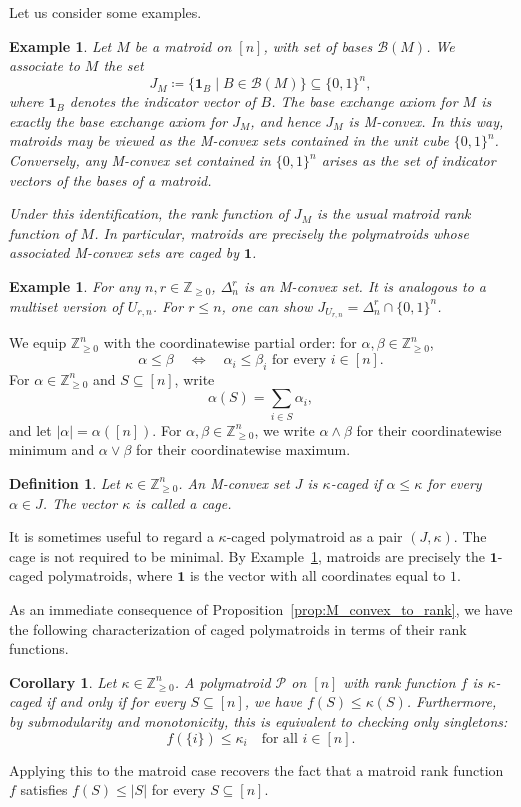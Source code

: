 \documentclass[10pt,a4paper]{amsart}
\newtheorem{corollary}[theorem]{Corollary}
\newtheorem{definition}[theorem]{Definition}
\newtheorem{example}[theorem]{Example}
\newcommand{\Zgeq}{\mathbb{Z}_{\geq 0}}       %
\newcommand{\Zgeqn}{\mathbb{Z}_{\geq 0}^n}     %
\newcommand{\dnr}{\Delta_n^r}
\newcommand{\ones}{\textbf{1}}
\begin{document}
Let us consider some examples.
\begin{example}\label{example:matroids_are_polymatroids}
    Let $M$ be a matroid on $[n]$, with set of bases $\mathcal{B}(M)$. We associate to $M$ the set
    \[
        J_M \coloneqq \{\ones_B \mid B \in \mathcal{B}(M)\} \subseteq \{0,1\}^n,
    \]
    where $\ones_B$ denotes the indicator vector of $B$. The base exchange axiom for $M$ is exactly the base exchange axiom for $J_M$, and hence $J_M$ is M-convex. In this way, matroids may be viewed as the M-convex sets contained in the unit cube $\{0,1\}^n$. Conversely, any M-convex set contained in $\{0,1\}^n$ arises as the set of indicator vectors of the bases of a matroid.

    Under this identification, the rank function of $J_M$ is the usual matroid rank function of $M$. In particular, matroids are precisely the polymatroids whose associated M-convex sets are caged by $\ones$.
\end{example}
\begin{example}
    For any $n,r \in \Zgeq$, $\dnr$ is an M-convex set. It is analogous to a multiset version of $U_{r,n}$. For $r \leq n$, one can show $J_{U_{r,n}} = \dnr \cap \{ 0,1\}^n$. 
\end{example}

We equip $\Zgeqn$ with the coordinatewise partial order: for $\alpha,\beta\in\Zgeqn$,
\[
    \alpha\leq\beta
    \quad\Longleftrightarrow\quad
    \alpha_i\leq\beta_i \text{ for every } i\in[n].
\]
For $\alpha\in\Zgeqn$ and $S\subseteq[n]$, write
\[
    \alpha(S)=\sum_{i\in S}\alpha_i,
\]
and let $|\alpha|=\alpha([n])$. For $\alpha,\beta\in\Zgeqn$, we write $\alpha\wedge\beta$ for their coordinatewise minimum and $\alpha\vee\beta$ for their coordinatewise maximum.
\begin{definition}\label{def:caged_polymatroids}
    Let $\kappa\in\Zgeqn$. An M-convex set $J$ is \emph{$\kappa$-caged} if $\alpha\leq\kappa$ for every $\alpha\in J$. The vector $\kappa$ is called a \emph{cage}.
\end{definition}
It is sometimes useful to regard a $\kappa$-caged polymatroid as a pair $(J,\kappa)$. The cage is not required to be minimal. By Example~\ref{example:matroids_are_polymatroids}, matroids are precisely the $\ones$-caged polymatroids, where $\ones$ is the vector with all coordinates equal to $1$.

As an immediate consequence of Proposition~\ref{prop:M_convex_to_rank}, we have the following characterization of caged polymatroids in terms of their rank functions.
\begin{corollary} \label{corollary:caged_polymatroids_rank}
    Let $\kappa \in \Zgeqn$. A polymatroid $\mathcal{P}$ on $[n]$ with rank function $f$ is $\kappa$-caged if and only if for every $S \subseteq [n]$, we have $f(S) \leq \kappa(S)$. Furthermore, by submodularity and monotonicity, this is equivalent to checking only singletons: 
    \[
    f(\{i\}) \leq \kappa_i \quad \text{for all } i \in [n].
    \]
\end{corollary}
Applying this to the matroid case recovers the fact that a matroid rank function $f$ satisfies $f(S) \leq |S|$ for every $S \subseteq [n]$.
\end{document}
